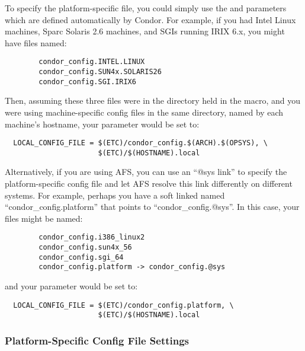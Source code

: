 To specify the platform-specific file, you could simply use the
 and  parameters which are defined
automatically by Condor.  For example, if you had Intel Linux
machines, Sparc Solaris 2.6 machines, and SGIs running IRIX 6.x, you
might have files named:

\begin{verbatim}
        condor_config.INTEL.LINUX
        condor_config.SUN4x.SOLARIS26
        condor_config.SGI.IRIX6
\end{verbatim}

Then, assuming these three files were in the directory held in the
 macro, and you were using machine-specific config files in
the same directory, named by each machine's hostname, your
 parameter would be set to:

\begin{verbatim}
  LOCAL_CONFIG_FILE = $(ETC)/condor_config.$(ARCH).$(OPSYS), \
                      $(ETC)/$(HOSTNAME).local
\end{verbatim}

Alternatively, if you are using AFS, you can use an ``@sys link'' to
specify the platform-specific config file and let AFS resolve this
link differently on different systems.  For example, perhaps you have
a soft linked named ``condor\_config.platform'' that points to
``condor\_config.@sys''.  In this case, your files might be named:

\begin{verbatim}
        condor_config.i386_linux2
        condor_config.sun4x_56
        condor_config.sgi_64
        condor_config.platform -> condor_config.@sys
\end{verbatim}

and your  parameter would be set to:

\begin{verbatim}
  LOCAL_CONFIG_FILE = $(ETC)/condor_config.platform, \
                      $(ETC)/$(HOSTNAME).local
\end{verbatim}

\subsubsection{Platform-Specific Config File Settings}
\label{sec:Platform-Specific-Settings}

